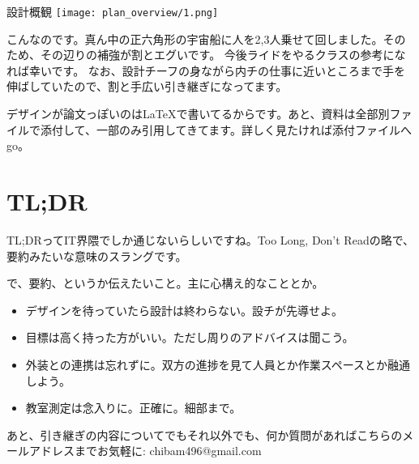 \documentclass[uplatex,dvipdfmx]{jsreport}
\begin{document}
\begin{imageHere}{設計概観}
    \texttt{[image: plan\_overview/1.png]}
\end{imageHere}

こんなのです。真ん中の正六角形の宇宙船に人を2,3人乗せて回しました。そのため、その辺りの補強が割とエグいです。
今後ライドをやるクラスの参考になれば幸いです。
なお、設計チーフの身ながら内チの仕事に近いところまで手を伸ばしていたので、割と手広い引き継ぎになってます。

デザインが論文っぽいのは\LaTeX{}で書いてるからです。あと、資料は全部別ファイルで添付して、一部のみ引用してきてます。詳しく見たければ添付ファイルへgo。

\clearpage


\section{TL;DR}
TL;DRってIT界隈でしか通じないらしいですね。Too Long, Don't Readの略で、要約みたいな意味のスラングです。

で、要約、というか伝えたいこと。主に心構え的なこととか。

\begin{itemize}
    \item デザインを待っていたら設計は終わらない。設チが先導せよ。
    \item 目標は高く持った方がいい。ただし周りのアドバイスは聞こう。
    \item 外装との連携は忘れずに。双方の進捗を見て人員とか作業スペースとか融通しよう。
    \item 教室測定は念入りに。正確に。細部まで。
\end{itemize}

あと、引き継ぎの内容についてでもそれ以外でも、何か質問があればこちらのメールアドレスまでお気軽に:  chibam496@gmail.com
\end{document}
